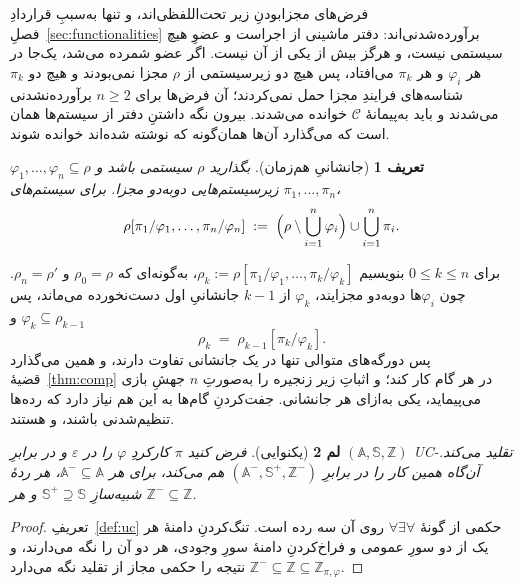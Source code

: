 \documentclass[10pt,oneside,openany]{book}
\newcommand{\Corr}{\mathcal{C}}
\newcommand{\Aset}{\mathbb{A}}
\newcommand{\SimSet}{\mathbb{S}}
\newcommand{\ZenvSet}{\mathbb{Z}}
\theoremstyle{accentdef}
\newtheorem{definition}{تعریف}[chapter]
\theoremstyle{accentplain}
\newtheorem{lemma}[definition]{لم}
\begin{document}
فرض‌های مجزابودنِ زیر تحت‌اللفظی‌اند، و تنها به‌سببِ قراردادِ
فصلِ~\ref{sec:functionalities} برآورده‌شدنی‌اند: دفتر ماشینی از اجراست و
عضوِ هیچ سیستمی نیست، و هرگز بیش از یکی از آن نیست. اگر عضو شمرده می‌شد،
یک‌جا در هر $\varphi_i$ و هر $\pi_k$ می‌افتاد، پس هیچ دو زیرسیستمی از
$\rho$ مجزا نمی‌بودند و هیچ دو $\pi_k$ شناسه‌های فرایندِ مجزا حمل
نمی‌کردند؛ آن فرض‌ها برای $n \geq 2$ برآورده‌نشدنی می‌شدند و باید به‌پیمانهٔ
$\Corr$ خوانده می‌شدند. بیرون نگه داشتنِ دفتر از سیستم‌ها همان است که
می‌گذارد آن‌ها همان‌گونه که نوشته شده‌اند خوانده شوند.

\begin{definition}[جانشانیِ هم‌زمان]\label{def:multirepl}
بگذارید $\rho$ سیستمی باشد و $\varphi_1,\dots,\varphi_n \subseteq \rho$
زیرسیستم‌هایی دوبه‌دو مجزا. برای سیستم‌های $\pi_1,\dots,\pi_n$،
\[
  \rho[\pi_1/\varphi_1,\dots,\pi_n/\varphi_n] \;:=\; \Bigl(\rho \setminus \bigcup_{i=1}^{n} \varphi_i\Bigr) \cup \bigcup_{i=1}^{n} \pi_i .
\]
\end{definition}

برای $0 \leq k \leq n$ بنویسیم $\rho_k :=
\rho[\pi_1/\varphi_1,\dots,\pi_k/\varphi_k]$، به‌گونه‌ای که $\rho_0 = \rho$
و $\rho_n = \rho'$. چون $\varphi_i$ها دوبه‌دو مجزایند، $\varphi_k$ از
$k-1$ جانشانیِ اول دست‌نخورده می‌ماند، پس $\varphi_k \subseteq \rho_{k-1}$
و
\[
  \rho_k \;=\; \rho_{k-1}[\pi_k/\varphi_k] .
\]
پس دورگه‌های متوالی تنها در یک جانشانی تفاوت دارند، و همین می‌گذارد
قضیهٔ~\ref{thm:comp} در هر گام کار کند؛ و اثباتِ زیر زنجیره را به‌صورتِ
$n$ جهشِ بازی می‌پیماید، یکی به‌ازای هر جانشانی. جفت‌کردنِ گام‌ها به این هم
نیاز دارد که رده‌ها تنظیم‌شدنی باشند، و هستند.

\begin{lemma}[یکنوایی]\label{lem:mono}
فرض کنید $\pi$ کارکردِ $\varphi$ را در $\varepsilon$ و در برابرِ
$(\Aset,\SimSet,\ZenvSet)$ UC-تقلید می‌کند. آن‌گاه همین کار را در برابرِ
$(\Aset^{-},\SimSet^{+},\ZenvSet^{-})$ هم می‌کند، برای هر $\Aset^{-}
\subseteq \Aset$، هر ردهٔ شبیه‌سازِ $\SimSet^{+} \supseteq \SimSet$ و هر
$\ZenvSet^{-} \subseteq \ZenvSet$.
\end{lemma}

\begin{proof}
تعریفِ~\ref{def:uc} حکمی از گونهٔ $\forall\exists\forall$ روی آن سه رده
است. تنگ‌کردنِ دامنهٔ هر یک از دو سورِ عمومی و فراخ‌کردنِ دامنهٔ سورِ وجودی،
هر دو آن را نگه می‌دارند، و $\ZenvSet^{-} \subseteq \ZenvSet \subseteq
\ZenvSet_{\pi,\varphi}$ نتیجه را حکمی مجاز از تقلید نگه می‌دارد.
\end{proof}
\end{document}
